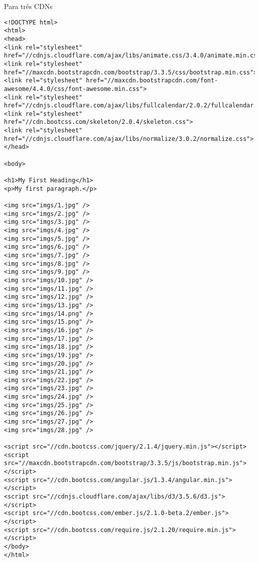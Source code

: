 \begin{apendicesenv}
Para três CDNs
\begin{lstlisting}
<!DOCTYPE html>
<html>
<head>
<link rel="stylesheet" href="//cdnjs.cloudflare.com/ajax/libs/animate.css/3.4.0/animate.min.css">
<link rel="stylesheet" href="//maxcdn.bootstrapcdn.com/bootstrap/3.3.5/css/bootstrap.min.css">
<link rel="stylesheet" href="//maxcdn.bootstrapcdn.com/font-awesome/4.4.0/css/font-awesome.min.css">	
<link rel="stylesheet" href="//cdnjs.cloudflare.com/ajax/libs/fullcalendar/2.0.2/fullcalendar.js">
<link rel="stylesheet" href="//cdn.bootcss.com/skeleton/2.0.4/skeleton.css">
<link rel="stylesheet" href="//cdnjs.cloudflare.com/ajax/libs/normalize/3.0.2/normalize.css">
</head>

<body>

<h1>My First Heading</h1>
<p>My first paragraph.</p>
	
<img src="imgs/1.jpg" />
<img src="imgs/2.jpg" />
<img src="imgs/3.jpg" />
<img src="imgs/4.jpg" />
<img src="imgs/5.jpg" />
<img src="imgs/6.jpg" />
<img src="imgs/7.jpg" />
<img src="imgs/8.jpg" />
<img src="imgs/9.jpg" />
<img src="imgs/10.jpg" />
<img src="imgs/11.jpg" />
<img src="imgs/12.jpg" />
<img src="imgs/13.jpg" />
<img src="imgs/14.png" />
<img src="imgs/15.png" />
<img src="imgs/16.jpg" />
<img src="imgs/17.jpg" />
<img src="imgs/18.jpg" />
<img src="imgs/19.jpg" />
<img src="imgs/20.jpg" />
<img src="imgs/21.jpg" />
<img src="imgs/22.jpg" />
<img src="imgs/23.jpg" />
<img src="imgs/24.jpg" />
<img src="imgs/25.jpg" />
<img src="imgs/26.jpg" />
<img src="imgs/27.jpg" />
<img src="imgs/28.jpg" />

<script src="//cdn.bootcss.com/jquery/2.1.4/jquery.min.js"></script>
<script src="//maxcdn.bootstrapcdn.com/bootstrap/3.3.5/js/bootstrap.min.js"></script>
<script src="//cdn.bootcss.com/angular.js/1.3.4/angular.min.js"></script>
<script src="//cdnjs.cloudflare.com/ajax/libs/d3/3.5.6/d3.js"></script>
<script src="//cdn.bootcss.com/ember.js/2.1.0-beta.2/ember.js"></script>
<script src="//cdn.bootcss.com/require.js/2.1.20/require.min.js"></script>	
</body>
</html>

\end{lstlisting}

\end{apendicesenv}
